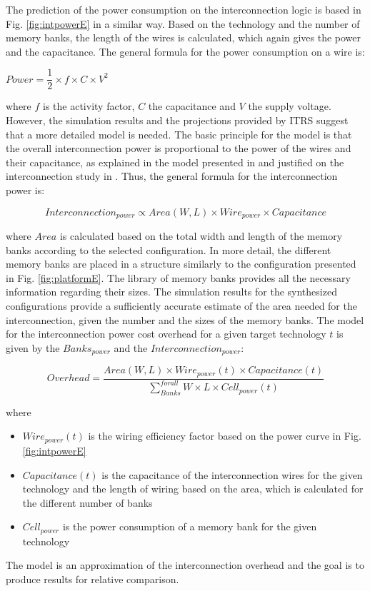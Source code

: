   
 The prediction of the power consumption on the interconnection logic is based in Fig. \ref{fig:intpowerE} in a similar way.
 Based on the technology and the number of memory banks, the length of the wires is calculated, which again gives the power and the capacitance.
 The general formula for the power consumption on a wire is:  
 \begin{center}
 $Power = \dfrac{1}{2} \times f \times C \times V^{2} $
 \end{center}
 where  $f$ is the activity factor, $C$ the capacitance and $V$ the supply voltage.
 However, the simulation results and the projections provided by ITRS suggest that a more detailed model is needed. 
 The basic principle for the model is that the overall interconnection power is proportional to the power of the wires and their capacitance, as explained in  the model presented in \cite{wong2000modeling} and justified on the interconnection study in \cite{muralimanohar2007interconnect}.
 Thus, the general formula for the interconnection power is:
 \begin{center}
 $$ Interconnection_{power} \propto Area(W,L) \times Wire_{power} \times Capacitance $$
 \end{center}
 where $Area$ is calculated based on the total width and length of the memory banks according to the selected configuration.
  In more detail, the different memory banks are placed in a structure similarly to the configuration presented in Fig. \ref{fig:platformE}.
  The library of memory banks provides all the necessary information regarding their sizes.
  The simulation results for the synthesized configurations provide a sufficiently accurate estimate of the area needed for the interconnection, given the number and the sizes of the memory banks.
 The model for the interconnection power cost overhead for a given target technology $ t $ is given by the $ Banks_{power}$ and the $ Interconnection_{power}$:
 \begin{center}
 $$ Overhead = \dfrac{Area(W,L) \times Wire_{power}(t) \times Capacitance(t)}{\sum_{Banks}^{for all} W \times L \times Cell_{power}(t)} $$ 
  \end{center}
 where 
 \begin{itemize}
 \item $ Wire_{power}(t) $ is the wiring efficiency factor based on the power curve in Fig. \ref{fig:intpowerE}
 \item $Capacitance(t)$ is the capacitance of the interconnection wires for the given technology and the length of wiring based on the area, which is calculated for the different number of banks
 \item $Cell_{power} $ is the power consumption of a memory bank for the given technology
 \end{itemize}
 The model is an approximation of the interconnection overhead and the goal is to produce results for relative comparison. 

